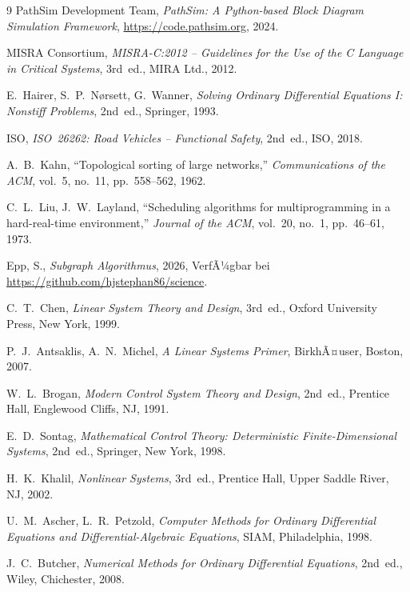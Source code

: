 ﻿\documentclass[12pt,a4paper]{article}
\theoremstyle{definition}
\begin{document}
\begin{thebibliography}{9}
  PathSim Development Team,
  \emph{PathSim: A Python-based Block Diagram Simulation Framework},
  \url{https://code.pathsim.org}, 2024.

  MISRA Consortium,
  \emph{MISRA-C:2012 -- Guidelines for the Use of the C Language in Critical Systems},
  3rd~ed., MIRA Ltd., 2012.

  E.~Hairer, S.~P.~N{\o}rsett, G.~Wanner,
  \emph{Solving Ordinary Differential Equations I: Nonstiff Problems},
  2nd~ed., Springer, 1993.

  ISO,
  \emph{ISO~26262: Road Vehicles -- Functional Safety},
  2nd~ed., ISO, 2018.

  A.~B.~Kahn,
  ``Topological sorting of large networks,''
  \emph{Communications of the ACM}, vol.~5, no.~11, pp.~558--562, 1962.

  C.~L.~Liu, J.~W.~Layland,
  ``Scheduling algorithms for multiprogramming in a hard-real-time environment,''
  \emph{Journal of the ACM}, vol.~20, no.~1, pp.~46--61, 1973.

Epp, S.,
\textit{Subgraph Algorithmus},
2026, VerfÃ¼gbar bei \url{https://github.com/hjstephan86/science}.

  C.~T.~Chen,
  \emph{Linear System Theory and Design},
  3rd~ed., Oxford University Press, New York, 1999.

  P.~J.~Antsaklis, A.~N.~Michel,
  \emph{A Linear Systems Primer},
  BirkhÃ¤user, Boston, 2007.

  W.~L.~Brogan,
  \emph{Modern Control System Theory and Design},
  2nd~ed., Prentice Hall, Englewood Cliffs, NJ, 1991.

  E.~D.~Sontag,
  \emph{Mathematical Control Theory: Deterministic Finite-Dimensional Systems},
  2nd~ed., Springer, New York, 1998.

  H.~K.~Khalil,
  \emph{Nonlinear Systems},
  3rd~ed., Prentice Hall, Upper Saddle River, NJ, 2002.

  U.~M.~Ascher, L.~R.~Petzold,
  \emph{Computer Methods for Ordinary Differential Equations and Differential-Algebraic Equations},
  SIAM, Philadelphia, 1998.

  J.~C.~Butcher,
  \emph{Numerical Methods for Ordinary Differential Equations},
  2nd~ed., Wiley, Chichester, 2008.


\end{thebibliography}
\end{document}
